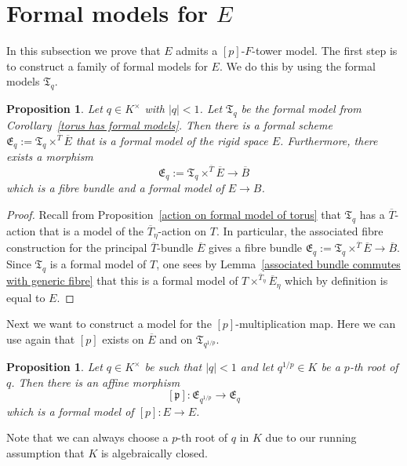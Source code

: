 \documentclass[10pt,oneside]{amsart}
\newtheorem{proposition}[theorem]{Proposition}
\theoremstyle{definition}
\begin{document}
	\section{Formal models for $E$}
	In this subsection we prove that $E$ admits a $[p]$-$F$-tower model. The first step is to construct a family of formal models for $E$. We do this by using the formal models $\mathfrak T_q$.
	\begin{proposition}
	Let $q\in K^\times$ with $|q|<1$. Let $\mathfrak T_q$ be the formal model from Corollary~\ref{torus has formal models}. Then there is a formal scheme $\mathfrak E_q :=\mathfrak T_q \times^{\overline{T}}\overline{E}$ that is a formal model of the rigid space $E$. Furthermore, there exists a morphism
	\[\mathfrak E_q :=\mathfrak T_q \times^{\overline{T}} \overline{E} \rightarrow \overline{B} \]
	which is a fibre bundle and a formal model of $E\rightarrow B$.
	\end{proposition}
	\begin{proof}
		Recall from Proposition~\ref{action on formal model of torus} that $\mathfrak T_q$ has a $\overline{T}$-action that is a model of the $\overline{T}_\eta$-action on $T$. In particular, the associated fibre construction for the principal $\overline{T}$-bundle $\overline{E}$ gives a fibre bundle $\mathfrak E_q :=\mathfrak T_q \times^{\overline{T}} \overline{E} \rightarrow \overline{B}$. Since $\mathfrak T_q$ is a formal model of $T$, one sees by Lemma~\ref{associated bundle commutes with generic fibre} that this is a formal model of $T\times^{\overline{T}_\eta}\overline{E}_\eta$ which by definition is equal to $E$.
	\end{proof}
	Next we want to construct a model for the $[p]$-multiplication map. Here we can use again that $[p]$ exists on $\overline{E}$ and on $\mathfrak T_{q^{1/p}}$.
	\begin{proposition}\label{formal model of p-multiplication on E}
		Let $q\in K^\times$ be such that $|q|<1$ and let $q^{1/p}\in K$ be a $p$-th root of $q$. Then there is an affine morphism
		\[[\mathfrak p]:\mathfrak E_{q^{1/p}} \rightarrow  \mathfrak E_{q}\]
		which is a formal model of $[p]:E\rightarrow E$.
	\end{proposition}
		Note that we can always choose a $p$-th root of $q$ in $K$ due to our running assumption that $K$ is algebraically closed.
\end{document}
